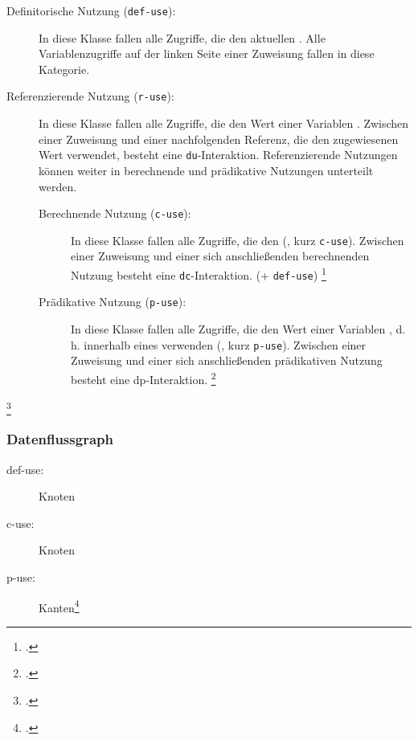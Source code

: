 \documentclass{lehramt-informatik}
\begin{document}
\begin{description}
\item[Definitorische Nutzung (\texttt{def-use}):]

In diese Klasse fallen alle Zugriffe, die den aktuellen . Alle Variablenzugriffe auf der linken
Seite einer Zuweisung fallen in diese Kategorie. 

\item[Referenzierende Nutzung (\texttt{r-use}):]

In diese Klasse fallen alle Zugriffe, die den Wert einer Variablen
. Zwischen einer Zuweisung und
einer nachfolgenden Referenz, die den zugewiesenen Wert verwendet,
besteht eine \texttt{du}-Interaktion. Referenzierende Nutzungen können
weiter in berechnende und prädikative Nutzungen unterteilt werden.

\begin{description}
\item[Berechnende Nutzung (\texttt{c-use}):]

In diese Klasse fallen alle Zugriffe, die den  (,
kurz \texttt{c-use}). Zwischen einer Zuweisung und einer sich
anschließenden berechnenden Nutzung besteht eine
\texttt{dc}-Interaktion.  (+ \texttt{def-use})
\footcite[Seite 220]{hoffmannn}

\item[Prädikative Nutzung (\texttt{p-use}):]

In diese Klasse fallen alle Zugriffe, die den Wert einer Variablen
, d. h. innerhalb eines 
verwenden (, kurz \texttt{p-use}). Zwischen einer
Zuweisung und einer sich anschließenden prädikativen Nutzung besteht
eine dp-Interaktion. 
\footcite[Seite 221]{hoffmannn}
\end{description}
\end{description}
\footcite[Seite 42]{sosy:fs:5}

%

\subsubsection{Datenflussgraph}


\begin{description}
\item[def-use:] Knoten
\item[c-use:] Knoten
\item[p-use:] Kanten\footcite[Seite 43]{sosy:fs:5}
\end{description}
\end{document}
